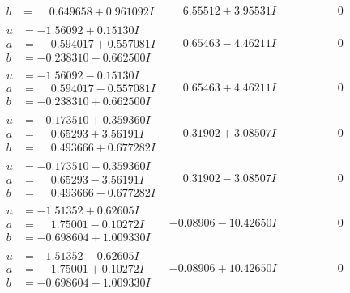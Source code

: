 \documentclass[1p]{elsarticle_modified}
\theoremstyle{definition}
\begin{document}
$$\begin{array}{c|c|c}
\begin{aligned}
b &= \phantom{-}0.649658 + 0.961092 I\end{aligned}
 & \phantom{-}6.55512 + 3.95531 I & \phantom{-0.000000 } 0 \\ \hline\begin{aligned}
u &= -1.56092 + 0.15130 I \\
a &= \phantom{-}0.594017 + 0.557081 I \\
b &= -0.238310 - 0.662500 I\end{aligned}
 & \phantom{-}0.65463 - 4.46211 I & \phantom{-0.000000 } 0 \\ \hline\begin{aligned}
u &= -1.56092 - 0.15130 I \\
a &= \phantom{-}0.594017 - 0.557081 I \\
b &= -0.238310 + 0.662500 I\end{aligned}
 & \phantom{-}0.65463 + 4.46211 I & \phantom{-0.000000 } 0 \\ \hline\begin{aligned}
u &= -0.173510 + 0.359360 I \\
a &= \phantom{-}0.65293 + 3.56191 I \\
b &= \phantom{-}0.493666 + 0.677282 I\end{aligned}
 & \phantom{-}0.31902 + 3.08507 I & \phantom{-0.000000 } 0 \\ \hline\begin{aligned}
u &= -0.173510 - 0.359360 I \\
a &= \phantom{-}0.65293 - 3.56191 I \\
b &= \phantom{-}0.493666 - 0.677282 I\end{aligned}
 & \phantom{-}0.31902 - 3.08507 I & \phantom{-0.000000 } 0 \\ \hline\begin{aligned}
u &= -1.51352 + 0.62605 I \\
a &= \phantom{-}1.75001 - 0.10272 I \\
b &= -0.698604 + 1.009330 I\end{aligned}
 & -0.08906 - 10.42650 I & \phantom{-0.000000 } 0 \\ \hline\begin{aligned}
u &= -1.51352 - 0.62605 I \\
a &= \phantom{-}1.75001 + 0.10272 I \\
b &= -0.698604 - 1.009330 I\end{aligned}
 & -0.08906 + 10.42650 I & \phantom{-0.000000 } 0 \\ \hline\begin{aligned}

\end{aligned}
\end{array}$$
\end{document}
